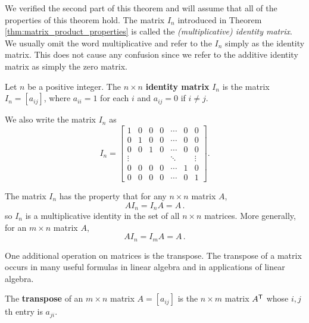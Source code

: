 We verified the second part of this theorem and will assume that all of the properties of this theorem hold. The matrix $I_n$ introduced in Theorem \ref{thm:matrix_product_properties} is called the \emph{(multiplicative) identity matrix}. We usually omit the word multiplicative and refer to the $I_n$ simply as the identity matrix. This does not cause any confusion since we refer to the additive identity matrix as simply the zero matrix.


 
\begin{definition} Let $n$ be a positive integer. The $n \times n$ \textbf{identity matrix} $I_n$ is the matrix $I_n = [a_{ij}]$, where $a_{ii} = 1$ for each $i$ and $a_{ij} = 0$ if $i \neq j$.
\end{definition}



We also write the matrix $I_n$ as
\[I_n = \left[ \begin{array}{ccccccc} 1 & 0 & 0 & 0 & \cdots & 0 & 0 \\ 0 & 1 & 0 & 0 & \cdots & 0 & 0 \\ 0 & 0 & 1 & 0 & \cdots & 0 & 0 \\ \vdots & & & & \ddots & & \vdots \\ 0 & 0 & 0 & 0 & \cdots & 1 & 0 \\ 0 & 0& 0 & 0 & \cdots & 0 & 1 \end{array} \right].\]

The matrix $I_n$ has the property that for any $n \times n$ matrix $A$,
\[AI_n = I_n A = A\,.\]
so $I_n$ is a multiplicative identity in the set of all $n \times n$ matrices. More generally, for an $m\times n$ matrix $A$,
\[ AI_n = I_mA = A \,.\]

\label{sec:mtx_transpose}

One additional operation on matrices is the transpose. The transpose of a matrix occurs in many useful formulas in linear algebra and in applications of linear algebra. 



\begin{definition} The \textbf{transpose} of an $m \times n$ matrix $A = [a_{ij}]$ is the $n \times m$ matrix
$A^{\mathsf{T}}$ whose $i,j$th entry is $a_{ji}$. 
\end{definition}



